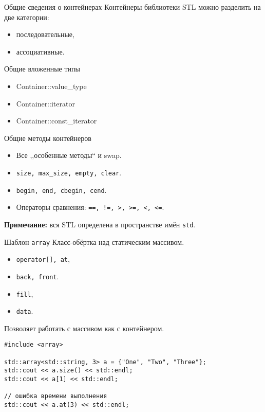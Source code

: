\documentclass{beamer}
\begin{document}
\begin{frame}{Общие сведения о контейнерах}
\small
    Контейнеры библиотеки STL можно разделить на две категории: 
    \begin{itemize}
        \item последовательные, 
        \item ассоциативные.
    \end{itemize}
    \pause
    \begin{block}{Общие вложенные типы}
    \begin{itemize} \tt
        \item Container::value\_type
        \item Container::iterator
        \item Container::const\_iterator 
    \end{itemize}
    \end{block}\pause\vspace{-3mm}
    \begin{block}{Общие методы контейнеров}
    \begin{itemize}
    \item Все ,,особенные методы`` и swap.

    \item \texttt{size, max\_size, empty, clear}.
    
    \item \texttt{begin, end, сbegin, сend}.

    \item Операторы сравнения: \texttt{==, !=, >, >=, <, <=}.
    \end{itemize}
\end{block}\vspace{-2mm}
\textbf{Примечание:} вся STL определена в пространстве имён \texttt{std}.
\end{frame}

\begin{frame}[fragile]{Шаблон {\tt array}}
    Класс-обёртка над статическим массивом.

\begin{itemize}
    \item \texttt{operator[], at},
    \item {\tt back, front}.
    \item \texttt{fill},
    \item \texttt{data}.
\end{itemize}
Позволяет работать с массивом как с контейнером.

\begin{lstlisting}
#include <array>

std::array<std::string, 3> a = {"One", "Two", "Three"};
std::cout << a.size() << std::endl;
std::cout << a[1] << std::endl;

// ошибка времени выполнения
std::cout << a.at(3) << std::endl; 
\end{lstlisting}
\end{frame}
\end{document}
